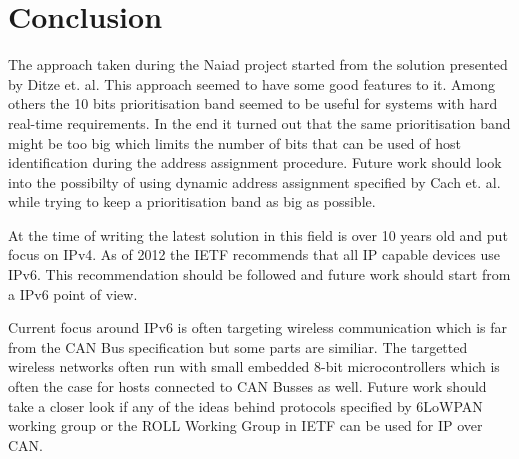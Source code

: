 \section{Conclusion}\label{sec:conclusion}
The approach taken during the Naiad project started from the solution presented
by Ditze et. al. This approach seemed to have some good features to it. Among
others the 10 bits prioritisation band seemed to be useful for systems with
hard real-time requirements. In the end it turned out that the same
prioritisation band might be too big which limits the number of bits that can be
used of host identification during the address assignment procedure. Future
work should look into the possibilty of using dynamic address assignment
specified by Cach et. al. while trying to keep a prioritisation band as big as
possible.

At the time of writing the latest solution in this field is over 10 years old
and put focus on IPv4. As of 2012 the IETF recommends that all IP capable
devices use IPv6. This recommendation should be followed and future work should
start from a IPv6 point of view.

Current focus around IPv6 is often targeting wireless communication which is
far from the CAN Bus specification but some parts are similiar. The targetted
wireless networks often run with small embedded 8-bit microcontrollers which is
often the case for hosts connected to CAN Busses as well. Future work should
take a closer look if any of the ideas behind protocols specified by 6LoWPAN
working group or the ROLL Working Group in IETF can be used for IP over CAN.


